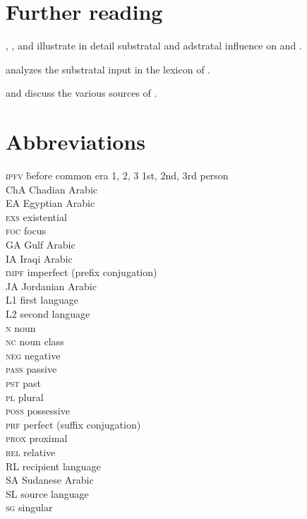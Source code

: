 \documentclass[output=paper]{langsci/langscibook}
\begin{document}
\section*{Further reading}
\begin{furtherreading}
\item[\citet{Miller1993}, \citet{Nakao2012}, and \citet{Luffin2014}]\sloppy illustrate in detail substratal and adstratal influence on   and .
\item[\citet{Avram2019}] analyzes the substratal input in the lexicon of .
\item[\citet{Avram2017article} and \citet{Bakir2017}] discuss the various sources of .
\end{furtherreading}

\section*{Abbreviations}
\setlength{\columnsep}{30pt}
\begin{multicols}{2}
\begin{tabbing}
\textsc{ipfv} \hspace{1em} \= before common era\kill
\textsc{1, 2, 3} \> 1st, 2nd, 3rd person \\
{ChA} \> {Chadian} {Arabic} \\
{EA} \> {Egyptian Arabic} \\
\textsc{exs} \> {existential} \\
\textsc{foc} \> focus \\
{GA} \> Gulf Arabic \\
{IA} \> {Iraqi} {Arabic} \\
\textsc{impf} \> imperfect (prefix conjugation) \\
{JA} \> {Jordanian} {Arabic} \\
L1 \> first language\\
L2 \> second language\\
\textsc{n} \> noun \\
\textsc{nc} \> noun class \\
\textsc{neg} \> negative \\
\textsc{pass} \> {passive} \\
\textsc{pst} \> past \\
\textsc{pl} \> plural \\
\textsc{poss} \> possessive \\
\textsc{prf} \> perfect (suffix conjugation) \\
\textsc{prox} \> proximal \\
\textsc{rel} \> {relative} \\
{RL} \> {recipient language} \\
SA \> {Sudanese} {Arabic} \\
{SL} \> {source language} \\
\textsc{sg} \> singular
\end{tabbing}
\end{multicols}


\sloppy\printbibliography[heading=subbibliography,notkeyword=this]
\end{document}
